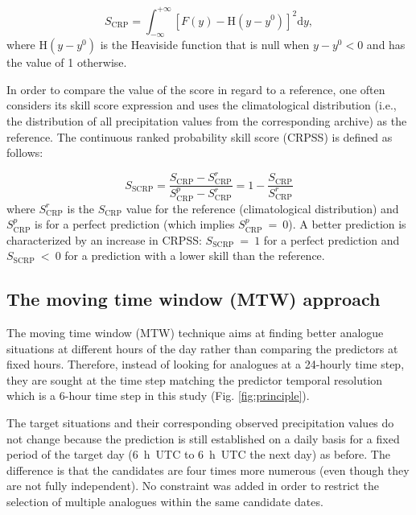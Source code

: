 \documentclass[hess, manuscript]{copernicus}
\begin{document}
	\begin{equation}
	\label{eq:CRPS}
	S_{\text{CRP}} = \int_{-\infty}^{+\infty} \left[ F(y)-\text{H}(y-y^{0})\right]^{2} \text{d}y ,  
	\end{equation}
	where $\text{H}(y-y^{0})$ is the Heaviside function that is null when $y-y^{0}<0$ and has the value of 1 otherwise.
	
	In order to compare the value of the score in regard to a reference, one often considers its skill score expression and uses the climatological distribution (i.e., the distribution of all precipitation values from the corresponding archive) as the reference. The continuous ranked probability skill score (CRPSS) is defined as follows:
	
	\begin{equation}
	\label{eq:CRPSS}
	S_{\text{SCRP}} = \frac{S_{\text{CRP}}-S_{\text{CRP}}^{r}}{S_{\text{CRP}}^{p}-S_{\text{CRP}}^{r}} = 1-\frac{S_{\text{CRP}}}{S_{\text{CRP}}^{r}}
	\end{equation}
	where $S_{\text{CRP}}^{r}$ is the $S_{\text{CRP}}$ value for the reference (climatological distribution) and $S_{\text{CRP}}^{p}$ is for a perfect prediction (which implies $S_{\text{CRP}}^{p}~=~0$). A better prediction is characterized by an increase in CRPSS: $S_{\text{SCRP}}~=~1$ for a perfect prediction and $S_{\text{SCRP}}~<~0$ for a prediction with a lower skill than the reference.
	
	
	\subsection{The moving time window (MTW) approach}
	\label{sec:mtw}
	
	The moving time window (MTW) technique aims at finding better analogue situations at different hours of the day rather than comparing the predictors at fixed hours. Therefore, instead of looking for analogues at a 24-hourly time step, they are sought at the time step matching the predictor temporal resolution which is a 6-hour time step in this study (Fig. \ref{fig:principle}).
	
	The target situations and their corresponding observed precipitation values do not change because the prediction is still established on a daily basis for a fixed period of the target day (6~h~UTC to 6~h~UTC the next day) as before. The difference is that the candidates are four times more numerous (even though they are not fully independent). No constraint was added in order to restrict the selection of multiple analogues within the same candidate dates.
	
\end{document}
